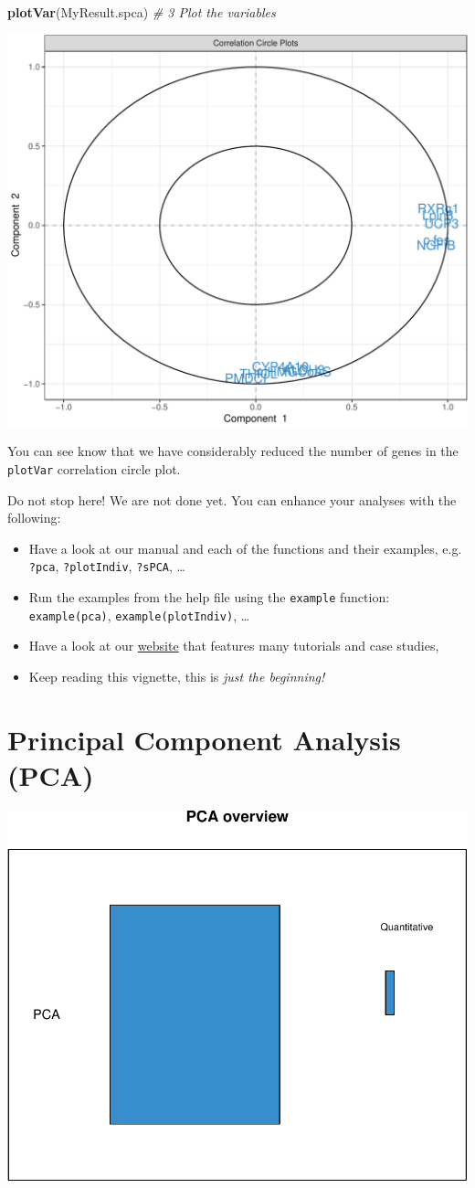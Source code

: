 \documentclass[]{book}
\newenvironment{Shaded}{\begin{snugshade}}{\end{snugshade}}
\newcommand{\CommentTok}[1]{\textcolor[rgb]{0.56,0.35,0.01}{\textit{#1}}}
\newcommand{\KeywordTok}[1]{\textcolor[rgb]{0.13,0.29,0.53}{\textbf{#1}}}
\newcommand{\NormalTok}[1]{#1}
\begin{document}
\begin{Shaded}
\begin{Highlighting}[]
\KeywordTok{plotVar}\NormalTok{(MyResult.spca)                 }\CommentTok{# 3 Plot the variables}
\end{Highlighting}
\end{Shaded}

\begin{center}\includegraphics[width=0.5\linewidth,]{Figures/02-spca-nutrimouse-2} \end{center}

You can see know that we have considerably reduced the number of genes in the \texttt{plotVar} correlation circle plot.

Do not stop here! We are not done yet. You can enhance your analyses with the following:

\begin{itemize}
\item
  Have a look at our manual and each of the functions and their examples, e.g. \texttt{?pca}, \texttt{?plotIndiv}, \texttt{?sPCA}, \ldots{}
\item
  Run the examples from the help file using the \texttt{example} function: \texttt{example(pca)}, \texttt{example(plotIndiv)}, \ldots{}
\item
  Have a look at our \href{http://www.mixomics.org}{website} that features many tutorials and case studies,
\item
  Keep reading this vignette, this is \emph{just the beginning!}
\end{itemize}

\hypertarget{pca}{%
\chapter{Principal Component Analysis (PCA)}\label{pca}}

\begin{center}\includegraphics[width=0.5\linewidth,]{Figures/03-overview-PCA-1} \end{center}
\end{document}
